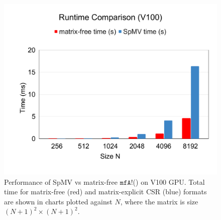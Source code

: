 \begin{figure}
    \centering
    \includegraphics[width=\linewidth]{figures/Runtime_Comparison_V100.pdf}
    \caption{Performance of SpMV vs matrix-free $\texttt{mfA!}$() on V100 GPU. Total time for matrix-free (red) and matrix-explicit CSR (blue) formats are shown in charts plotted against $N$, where the matrix is size $(N+1)^2 \times (N+1)^2$.}
    \label{fig:V100}
\end{figure}

